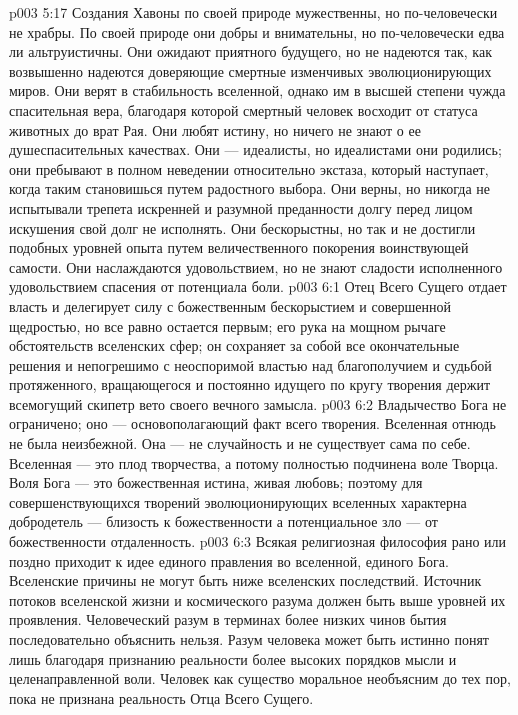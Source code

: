 \vs p003 5:17 \pc Создания Хавоны по своей природе мужественны, но по\hyp{}человечески не храбры. По своей природе они добры и внимательны, но по\hyp{}человечески едва ли альтруистичны. Они ожидают приятного будущего, но не надеются так, как возвышенно надеются доверяющие смертные изменчивых эволюционирующих миров. Они верят в стабильность вселенной, однако им в высшей степени чужда спасительная вера, благодаря которой смертный человек восходит от статуса животных до врат Рая. Они любят истину, но ничего не знают о ее душеспасительных качествах. Они --- идеалисты, но идеалистами они родились; они пребывают в полном неведении относительно экстаза, который наступает, когда таким становишься путем радостного выбора. Они верны, но никогда не испытывали трепета искренней и разумной преданности долгу перед лицом искушения свой долг не исполнять. Они бескорыстны, но так и не достигли подобных уровней опыта путем величественного покорения воинствующей самости. Они наслаждаются удовольствием, но не знают сладости исполненного удовольствием спасения от потенциала боли.
\vs p003 6:1 Отец Всего Сущего отдает власть и делегирует силу с божественным бескорыстием и совершенной щедростью, но все равно остается первым; его рука на мощном рычаге обстоятельств вселенских сфер; он сохраняет за собой все окончательные решения и непогрешимо с неоспоримой властью над благополучием и судьбой протяженного, вращающегося и постоянно идущего по кругу творения держит всемогущий скипетр вето своего вечного замысла.
\vs p003 6:2 Владычество Бога не ограничено; оно --- основополагающий факт всего творения. Вселенная отнюдь не была неизбежной. Она --- не случайность и не существует сама по себе. Вселенная --- это плод творчества, а потому полностью подчинена воле Творца. Воля Бога --- это божественная истина, живая любовь; поэтому для совершенствующихся творений эволюционирующих вселенных характерна добродетель --- близость к божественности а потенциальное зло --- от божественности отдаленность.
\vs p003 6:3 \pc Всякая религиозная философия рано или поздно приходит к идее единого правления во вселенной, единого Бога. Вселенские причины не могут быть ниже вселенских последствий. Источник потоков вселенской жизни и космического разума должен быть выше уровней их проявления. Человеческий разум в терминах более низких чинов бытия последовательно объяснить нельзя. Разум человека может быть истинно понят лишь благодаря признанию реальности более высоких порядков мысли и целенаправленной воли. Человек как существо моральное необъясним до тех пор, пока не признана реальность Отца Всего Сущего.
